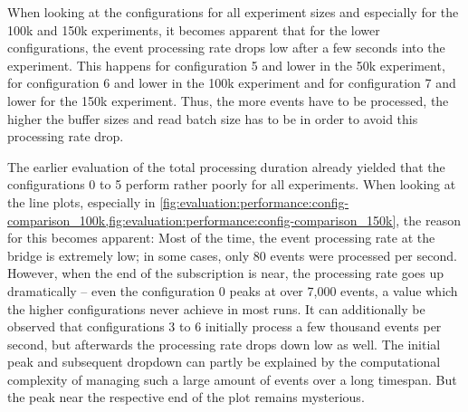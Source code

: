 When looking at the configurations for all experiment sizes and especially for the 100k and 150k experiments, it becomes apparent that for the lower configurations, the event processing rate drops low after a few seconds into the experiment.
This happens for configuration 5 and lower in the 50k experiment, for configuration 6 and lower in the 100k experiment and for configuration 7 and lower for the 150k experiment.
Thus, the more events have to be processed, the higher the buffer sizes and read batch size has to be in order to avoid this processing rate drop.

The earlier evaluation of the total processing duration already yielded that the configurations 0 to 5 perform rather poorly for all experiments.
When looking at the line plots, especially in \cref{fig:evaluation:performance:config-comparison_100k,fig:evaluation:performance:config-comparison_150k}, the reason for this becomes apparent:
Most of the time, the event processing rate at the bridge is extremely low; in some cases, only 80 events were processed per second.
However, when the end of the subscription is near, the processing rate goes up dramatically -- even the configuration 0 peaks at over 7,000 events, a value which the higher configurations never achieve in most runs.
It can additionally be observed that configurations 3 to 6 initially process a few thousand events per second, but afterwards the processing rate drops down low as well.
The initial peak and subsequent dropdown can partly be explained by the computational complexity of managing such a large amount of events over a long timespan.
But the peak near the respective end of the plot remains mysterious.

